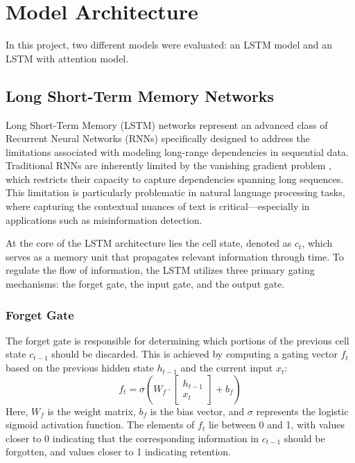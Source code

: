 \documentclass[sn-mathphys-ay, Numbered]{sn-jnl}
\theoremstyle{thmstyleone}%
\theoremstyle{thmstyletwo}%
\theoremstyle{thmstylethree}%
\begin{document}
\section{Model Architecture}\label{sec:Models}
In this project, two different models were evaluated: an LSTM model and an LSTM with attention model.

\subsection{Long Short-Term Memory Networks}

Long Short-Term Memory (LSTM) networks represent an advanced class of Recurrent Neural Networks (RNNs) specifically designed to address the limitations associated with modeling long-range dependencies in sequential data. Traditional RNNs are inherently limited by the vanishing gradient problem \citep{LSTM}, which restricts their capacity to capture dependencies spanning long sequences. This limitation is particularly problematic in natural language processing tasks, where capturing the contextual nuances of text is critical—especially in applications such as misinformation detection.

At the core of the LSTM architecture lies the cell state, denoted as \( c_t \), which serves as a memory unit that propagates relevant information through time. To regulate the flow of information, the LSTM utilizes three primary gating mechanisms: the forget gate, the input gate, and the output gate.

\subsubsection{Forget Gate}
The forget gate is responsible for determining which portions of the previous cell state \( c_{t-1} \) should be discarded. This is achieved by computing a gating vector \( f_t \) based on the previous hidden state \( h_{t-1} \) and the current input \( x_t \):
\[
f_t = \sigma\!\left(W_f \cdot \begin{bmatrix} h_{t-1} \\ x_t \end{bmatrix} + b_f\right)
\]
Here, \( W_f \) is the weight matrix, \( b_f \) is the bias vector, and \( \sigma \) represents the logistic sigmoid activation function. The elements of \( f_t \) lie between 0 and 1, with values closer to 0 indicating that the corresponding information in \( c_{t-1} \) should be forgotten, and values closer to 1 indicating retention.
\end{document}
